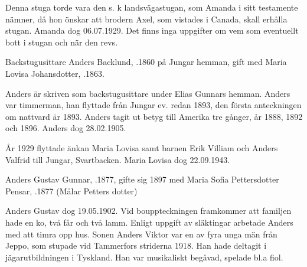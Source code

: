 

Denna stuga torde vara den s. k landsvägastugan, som Amanda i sitt testamente nämner, då hon önskar att brodern Axel, som vistades i Canada, skall erhålla stugan. Amanda dog 06.07.1929. Det finns inga uppgifter om vem som eventuellt bott i stugan och när den revs.


Backstugusittare Anders Backlund, .1860 på Jungar hemman, gift med Maria Lovisa Johansdotter, .1863.

\begin{jhchildren}
  \item {}
  \item {}
  \item {}
  \item {}
  \item {}
\end{jhchildren}

Anders är skriven som backstugusittare under Elias Gunnars hemman. Anders var timmerman, han flyttade från Jungar ev. redan 1893, den första anteckningen om nattvard är 1893. Anders tagit ut betyg till Amerika tre gånger, år 1888, 1892 och 1896. Anders dog 28.02.1905.

År 1929 flyttade änkan Maria Lovisa samt barnen Erik Villiam och Anders Valfrid till Jungar, Svartbacken. Maria Lovisa dog 22.09.1943.


Anders Gustav Gunnar, .1877, gifte sig 1897 med Maria Sofia Pettersdotter Pensar, .1877 (Målar Petters dotter)

\begin{jhchildren}
  \item {}
  \item {}
  \item {}
\end{jhchildren}

Anders Gustav dog 19.05.1902. Vid bouppteckningen framkommer att familjen hade en ko, två får och två lamm. Enligt uppgift av släktingar arbetade Anders med att timra opp hus. Sonen Anders Viktor var en av fyra unga män från Jeppo, som stupade vid Tammerfors striderna 1918. Han hade deltagit i jägarutbildningen i Tyskland. Han var musikaliskt begåvad, spelade bl.a fiol.


